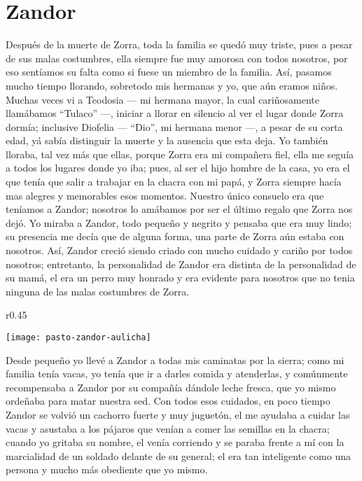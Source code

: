 \cleardoublepage
\newpage
{}
\chapter{Zandor}
Después de la muerte de Zorra, toda la familia se quedó muy triste, pues a pesar de sus malas costumbres, ella siempre fue muy amorosa con todos nosotros, por eso sentíamos su falta como si fuese un miembro de la familia.
Así, pasamos mucho tiempo llorando, sobretodo mis hermanas y yo, que aún eramos niños.
Muchas veces vi a Teodosia --- mi hermana mayor, la cual cariñosamente llamábamos ``Tulaco'' ---, iniciar a llorar en silencio al ver el lugar donde Zorra dormía; inclusive Diofelia --- ``Dio'', mi hermana menor ---, a pesar de su corta edad, yá sabía distinguir la muerte y la ausencia que esta deja.
Yo también lloraba, tal vez más que ellas, porque Zorra era mi compañera fiel, ella me seguía a todos los lugares donde yo iba; pues, al ser el hijo hombre de la casa, yo era el que tenía que salir a trabajar en la chacra con mi papá, y Zorra siempre hacía mas alegres y memorables esos momentos.
Nuestro único consuelo era que teníamos a Zandor; nosotros lo amábamos por ser el último regalo que Zorra nos dejó.
Yo miraba a Zandor, todo pequeño y negrito y pensaba que era muy lindo; su presencia me decía que de alguna forma, una parte de Zorra aún estaba con nosotros.
Así, Zandor creció siendo criado con mucho cuidado y cariño por todos nosotros;
entretanto, la personalidad de Zandor era distinta de la personalidad de su mamá, el era un perro muy honrado y era evidente para nosotros que no tenia ninguna de las malas costumbres de Zorra.
\begin{wrapfigure}{r}{0.45\textwidth}
  \begin{center}
  \vspace{-20pt}
    \texttt{[image: pasto-zandor-aulicha]}
  \end{center}
  \vspace{-20pt}
\end{wrapfigure}
Desde pequeño yo llevé a Zandor a todas mis caminatas por la sierra; como mi familia tenía vacas, yo tenía que ir a darles comida y atenderlas, y comúnmente recompensaba a Zandor por su compañía dándole leche fresca, que yo mismo ordeñaba para matar nuestra sed.
Con todos esos cuidados, en poco tiempo Zandor se volvió un cachorro fuerte y muy juguetón,
el me ayudaba a cuidar las vacas y asustaba a los pájaros que venían a comer las semillas en la chacra; cuando yo gritaba su nombre, el venía corriendo y se paraba frente a mí con la marcialidad de un soldado delante de su general; el era tan inteligente como una persona y mucho más obediente que yo mismo.

